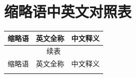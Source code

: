 \thispagestyle{appendixheader}
\setcounter{app_fig}{1}
\setcounter{app_tab}{1}
\setcounter{equation}{0}
\renewcommand\theequation{附\arabic{app}-\arabic{equation}}
\renewcommand\chaptername{附录}
\renewcommand\chaptername{Appendix} 
\renewcommand\thechapter{附录} 

\setcounter{chapter}{0}
\setcounter{section}{0}
\chapter{缩略语中英文对照表}\label{chap:app1}{

\begin{longtable}{p{} p{} p{}}
\toprule
缩略语 & 英文全称 & 中文释义 \\
\midrule
\endfirsthead

\multicolumn{3}{c}{续表} \\
\toprule
缩略语 & 英文全称 & 中文释义 \\
\midrule
\endhead

\bottomrule
\endfoot

\bottomrule
\endlastfoot


\end{longtable}}
